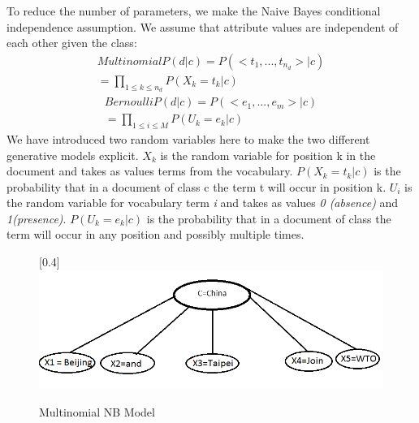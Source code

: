 \documentclass[journal]{IEEEtran}
\begin{document}
To reduce the number of parameters, we make the Naive Bayes conditional independence assumption. We assume that attribute values are independent of each other given the class:
\begin{equation}
\begin{split}
Multinomial P(d|c)=P(<t_{1},...,t_{n_{d}}>|c)\\=\prod_{1\leq k \leq n_{d}} P(X_{k}=t_{k}|c)
	\end{split}
\end{equation}
\begin{equation}
\begin{split}
Bernoulli P(d|c)=P(<e_{1},...,e_{m}>|c)\\=\prod_{1\leq i \leq M}P(U_{k}=e_{k}|c)
	\end{split}
\end{equation}
We have introduced two random variables here to make the two different generative models explicit. $X_{k}$ is the random variable for position k in the document and takes as values terms from the vocabulary. $P(X_{k}=t_{k}|c)$ is the probability that in a document of class c the term t will occur in position k. $U_{i}$ is the random variable for vocabulary term \textit{i} and takes as values \textit{0 (absence)} and \textit{1(presence)}. $P(U_{k}=e_{k}|c)$ is the probability that in a document of class the term will occur in any position and possibly multiple times.
\begin{center}
	\begin{figure}[H]
		\scalebox{0.4}[0.4]{\includegraphics{MultiNomialNBModel}}
		\caption{Multinomial NB Model}
		\label{Multinomial NB Model}
	\end{figure}
\end{center}
\end{document}
